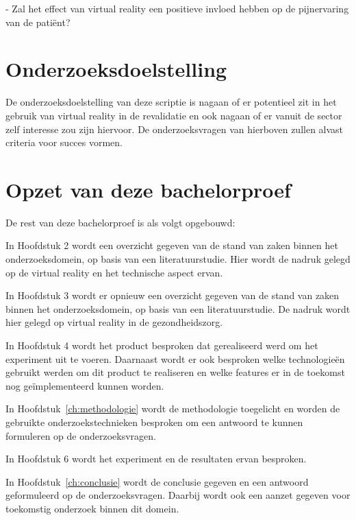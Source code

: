 - Zal het effect van virtual reality een positieve invloed hebben op de pijnervaring van de patiënt?


\section{Onderzoeksdoelstelling}
\label{sec:onderzoeksdoelstelling}
De onderzoeksdoelstelling van deze scriptie is nagaan of er potentieel zit in het gebruik van virtual reality in de revalidatie en ook nagaan of er vanuit de sector zelf interesse zou zijn hiervoor. De onderzoeksvragen van hierboven zullen alvast criteria voor succes vormen.


\section{Opzet van deze bachelorproef}
\label{sec:opzet-bachelorproef}


De rest van deze bachelorproef is als volgt opgebouwd:

In Hoofdstuk 2 wordt een overzicht gegeven van de stand van zaken binnen het onderzoeksdomein, op basis van een literatuurstudie. Hier wordt de nadruk gelegd op de virtual reality en het technische aspect ervan.

In Hoofdstuk 3 wordt er opnieuw een overzicht gegeven van de stand van zaken binnen het onderzoeksdomein, op basis van een literatuurstudie. De nadruk wordt hier gelegd op virtual reality in de gezondheidszorg.

In Hoofdstuk 4 wordt het product besproken dat gerealiseerd werd om het experiment uit te voeren. Daarnaast wordt er ook besproken welke technologieën gebruikt werden om dit product te realiseren en welke features er in de toekomst nog geïmplementeerd kunnen worden.

In Hoofdstuk~\ref{ch:methodologie} wordt de methodologie toegelicht en worden de gebruikte onderzoekstechnieken besproken om een antwoord te kunnen formuleren op de onderzoeksvragen.

In Hoofdstuk 6 wordt het experiment en de resultaten ervan besproken.

In Hoofdstuk~\ref{ch:conclusie} wordt de conclusie gegeven en een antwoord geformuleerd op de onderzoeksvragen. Daarbij wordt ook een aanzet gegeven voor toekomstig onderzoek binnen dit domein.

